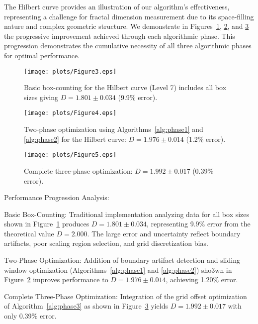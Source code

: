 \documentclass[preprint,12pt]{elsarticle}
\def\textbf#1{#1}%
\begin{document}
The Hilbert curve provides an illustration of our algorithm's effectiveness, representing a challenge for fractal dimension measurement due to its space-filling nature and complex geometric structure. We demonstrate in Figures~\ref{fig:hilbert_basic}, \ref{fig:hilbert_two_phase}, and \ref{fig:hilbert_three_phase} the progressive improvement achieved through each algorithmic phase. This progression demonstrates the cumulative necessity of all three algorithmic phases for optimal performance.

\begin{figure}[tbp]
\centering
\texttt{[image: plots/Figure3.eps]}
\caption{Basic box-counting for the Hilbert curve (Level 7) includes all box sizes giving $D = 1.801 \pm 0.034$ (9.9\% error).}
\label{fig:hilbert_basic}
\end{figure}

\begin{figure}[H]
\centering
\texttt{[image: plots/Figure4.eps]}
\caption{Two-phase optimization using Algorithms~\ref{alg:phase1} and \ref{alg:phase2} for the  Hilbert curve: $D = 1.976 \pm 0.014$ (1.2\% error).}
\label{fig:hilbert_two_phase}
\end{figure}

\begin{figure}[H]
\centering
\texttt{[image: plots/Figure5.eps]}
\caption{Complete three-phase optimization: $D = 1.992 \pm 0.017$ (0.39\% error).}
\label{fig:hilbert_three_phase}
\end{figure}

\textbf{Performance Progression Analysis}:

\textbf{Basic Box-Counting}: Traditional implementation analyzing data for all box sizes shown in Figure~\ref{fig:hilbert_basic} produces $D = 1.801 \pm 0.034$, representing 9.9\% error from the theoretical value $D = 2.000$. The large error and uncertainty reflect boundary artifacts, poor scaling region selection, and grid discretization bias.

\textbf{Two-Phase Optimization}: Addition of boundary artifact detection and sliding window optimization (Algorithms~\ref{alg:phase1} and \ref{alg:phase2}) sho3wn in Figure~\ref{fig:hilbert_two_phase} improves performance to $D = 1.976 \pm 0.014$, achieving 1.20\% error.

\textbf{Complete Three-Phase Optimization}: Integration of the grid offset optimization of Algorithm~\ref{alg:phase3} as shown in Figure~\ref{fig:hilbert_three_phase} yields $D = 1.992 \pm 0.017$ with only 0.39\% error.
\end{document}
